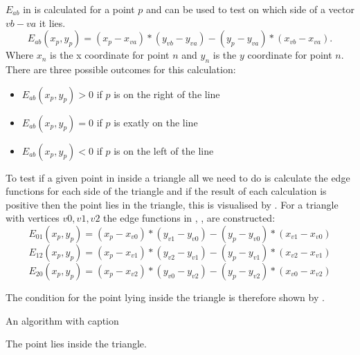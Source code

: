 $E_{ab}$ in  is calculated for a point $p$ and can be used to test on which side of a vector $vb-va$ it lies.
\begin{equation}\label{eqn:generalEdgeFunction}
    E_{ab}(x_p, y_p)=(x_p - x_{va})*(y_{vb}-y_{va})-(y_p-y_{va})*(x_{vb}-x_{va}).
\end{equation}
Where $x_n$ is the x coordinate for point $n$ and $y_n$ is the $y$ coordinate for point $n$. 
There are three possible outcomes for this calculation:
\begin{itemize}
    \item $E_{ab}(x_p, y_p) > 0$ if $p$ is on the right of the line
    \item $E_{ab}(x_p, y_p) = 0$ if $p$ is exatly on the line
    \item $E_{ab}(x_p, y_p) < 0$ if $p$ is on the left of the line
\end{itemize}

To test if a given point in inside a triangle all we need to do is calculate the edge functions for each side of the triangle and if the result of each calculation is positive then the point lies in the triangle, this is visualised by . 
For a triangle with vertices $v0, v1, v2$ the edge functions in ,
,   are constructed:
\begin{equation}\label{eqn:triangleEdgeFunction01}
    E_{01}(x_p, y_p)=(x_p - x_{v0})*(y_{v1}-y_{v0})-(y_p-y_{v0})*(x_{v1} - x_{v0}) 
\end{equation}
\begin{equation}\label{eqn:triangleEdgeFunction12}
    E_{12}(x_p, y_p)=(x_p - x_{v1})*(y_{v2}-y_{v1})-(y_p-y_{v1})*(x_{v2} - x_{v1}) 
\end{equation}
\begin{equation}\label{eqn:triangleEdgeFunction20}
    E_{20}(x_p, y_p)=(x_p - x_{v2})*(y_{v0}-y_{v2})-(y_p-y_{v2})*(x_{v0} - x_{v2}) 
\end{equation}

The condition for the point lying inside the triangle is therefore shown by .

\begin{algorithm}
\caption{An algorithm with caption}\label{algorithm:pointInsideTriangleConditionPartial}
\begin{algorithmic}
            \State The point lies inside the triangle.
        \EndIf
    \EndIf
\end{algorithmic}
\end{algorithm}


